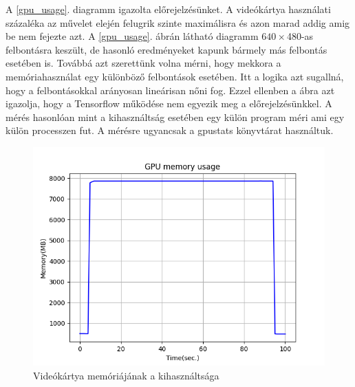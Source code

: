 \documentclass[12pt, a4paper, oneside]{book}
\theoremstyle{tetel}
\begin{document}
A \ref{gpu_usage}. diagramm igazolta előrejelzésünket. A videókártya használati százaléka az művelet elején felugrik szinte maximálisra és azon marad addig amig be nem fejezte azt. A \ref{gpu_usage}. ábrán látható diagramm $640 \times $480-as felbontásra keszült, de hasonló eredményeket kapunk bármely más felbontás esetében is.
\newline
\indent
Továbbá azt szerettünk volna mérni, hogy mekkora a memóriahasználat egy különböző felbontások esetében. Itt a logika azt sugallná, hogy a felbontásokkal arányosan lineárisan nőni fog. Ezzel ellenben a ábra azt igazolja, hogy a Tensorflow működése nem egyezik meg a előrejelzésünkkel. A mérés hasonlóan mint a kihasználtság esetében egy külön program méri ami egy külön processzen fut. A mérésre ugyancsak a gpustats könyvtárat használtuk.

\begin{figure}[!htbp]
	\begin{center}
		\includegraphics[scale=0.8]{gpu_memory_usage.png}
		\caption{Videókártya memóriájának a kihasználtsága}
		\label{gpu_memory_usage}
	\end{center}
\end{figure} 
\end{document}
